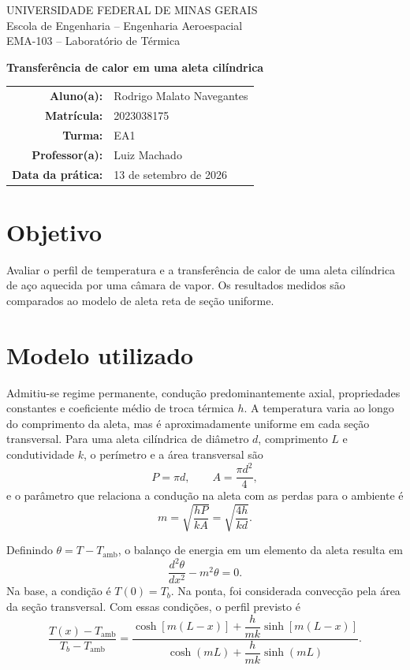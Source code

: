 \documentclass[11pt,a4paper]{article}
\begin{document}
\begin{center}
{\small UNIVERSIDADE FEDERAL DE MINAS GERAIS\\
Escola de Engenharia -- Engenharia Aeroespacial\\
EMA-103 -- Laboratório de Térmica}

\vspace{0.8cm}
{\Large\bfseries Transferência de calor em uma aleta cilíndrica}

\vspace{0.6cm}
\begin{tabular}{rl}
\textbf{Aluno(a):} & Rodrigo Malato Navegantes\\
\textbf{Matrícula:} & 2023038175\\
\textbf{Turma:} & EA1\\
\textbf{Professor(a):} & Luiz Machado\\
\textbf{Data da prática:} & 13 de setembro de 2026
\end{tabular}
\end{center}

\section{Objetivo}

Avaliar o perfil de temperatura e a transferência de calor de uma aleta
cilíndrica de aço aquecida por uma câmara de vapor. Os resultados medidos são
comparados ao modelo de aleta reta de seção uniforme.

\section{Modelo utilizado}

Admitiu-se regime permanente, condução predominantemente axial, propriedades
constantes e coeficiente médio de troca térmica $h$. A temperatura varia ao
longo do comprimento da aleta, mas é aproximadamente uniforme em cada seção
transversal. Para uma aleta cilíndrica de diâmetro $d$, comprimento $L$ e
condutividade $k$, o perímetro e a área transversal são
\begin{equation}
  P=\pi d,\qquad A=\frac{\pi d^2}{4},
\end{equation}
e o parâmetro que relaciona a condução na aleta com as perdas para o ambiente é
\begin{equation}
  m=\sqrt{\frac{hP}{kA}}=\sqrt{\frac{4h}{kd}}.
\end{equation}

Definindo $\theta=T-T_{\mathrm{amb}}$, o balanço de energia em um elemento da
aleta resulta em
\begin{equation}
  \frac{d^2\theta}{dx^2}-m^2\theta=0.
\end{equation}
Na base, a condição é $T(0)=T_b$. Na ponta, foi considerada convecção pela área
da seção transversal. Com essas condições, o perfil previsto é~\cite{incropera}
\begin{equation}
\frac{T(x)-T_{\mathrm{amb}}}{T_b-T_{\mathrm{amb}}}=
\frac{\cosh[m(L-x)]+\dfrac{h}{mk}\sinh[m(L-x)]}
{\cosh(mL)+\dfrac{h}{mk}\sinh(mL)}.
\label{eq:perfil}
\end{equation}
\end{document}
